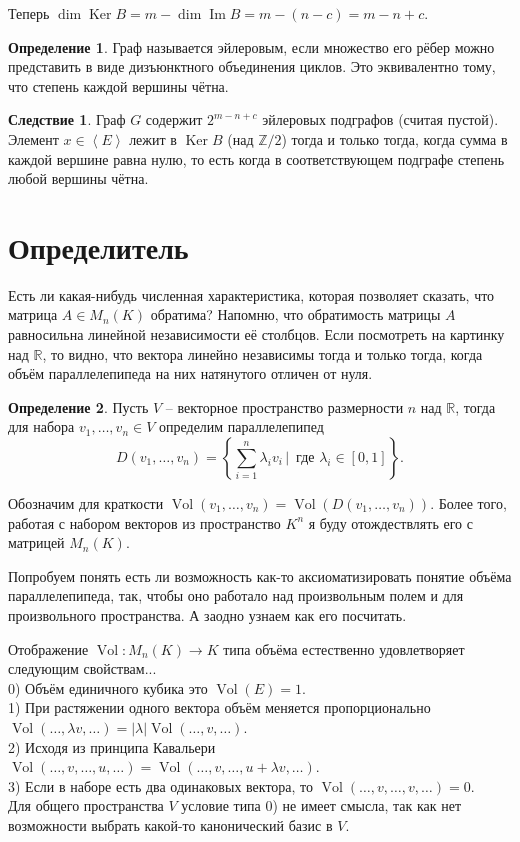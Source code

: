 \documentclass[10pt,a4paper,oneside]{book} %
\theoremstyle{definition}
\newtheorem*{defn}{Определение}
\newtheorem{cor}{Следствие}
\newcommand{\mb}[1]{\mathbb{#1}}
\newcommand{\Vol}{\operatorname{Vol}}
\DeclareMathOperator{\Ker}{Ker}
\renewcommand{\Im}{\operatorname{Im}}
\def\lan{\left\langle }
\def\ran{\right\rangle}
\def\dfn{\begin{defn}}
\def\edfn{\end{defn}}
\def\crl{\begin{cor}}
\def\ecrl{\end{cor}}
\begin{document}
Теперь $\dim \Ker B = m - \dim \Im B= m - (n-c)= m-n +c$.
\endproof

\dfn Граф называется эйлеровым, если множество его рёбер можно представить в виде дизъюнктного объединения циклов. Это эквивалентно тому, что степень каждой вершины чётна.
\edfn

\crl Граф $G$ содержит $2^{m-n+c}$ эйлеровых подграфов (считая пустой).
\proof Элемент $x \in \lan E \ran $ лежит в $\Ker B$ (над $\mb Z/2$) тогда и только тогда, когда сумма в каждой вершине равна нулю, то есть когда в соответствующем подграфе степень любой вершины чётна.
\endproof
\ecrl


\section{Определитель}

Есть ли какая-нибудь численная характеристика, которая позволяет сказать, что матрица $A\in M_n(K)$ обратима? Напомню, что обратимость матрицы $A$ равносильна линейной независимости её столбцов. Если посмотреть на картинку над $\mb R$, то видно, что вектора линейно независимы тогда и только тогда, когда объём параллелепипеда на них натянутого отличен от нуля.

\dfn Пусть $V$ -- векторное пространство размерности $n$ над $\mb R$, тогда для набора  $v_1,\dots,v_n \in V$ определим параллелепипед
$$D(v_1,\dots,v_n)=\left\{\sum_{i=1}^n \lambda_i v_i\,|\, \text{ где } \lambda_i\in [0,1]\right\}.$$
\edfn


Обозначим для краткости $\Vol(v_1,\dots,v_n)= \Vol (D(v_1,\dots,v_n))$. Более того, работая с набором векторов из пространство $K^n$ я буду отождествлять его с матрицей $M_n(K)$. 

Попробуем понять есть ли возможность как-то аксиоматизировать понятие объёма параллелепипеда, так, чтобы оно работало над произвольным полем и для произвольного пространства. А заодно узнаем как его посчитать.

Отображение $\Vol \colon M_n(K) \to K$ типа объёма естественно удовлетворяет следующим свойствам...\\
0) Объём единичного кубика это $\Vol(E)=1$.\\
1) При растяжении одного вектора объём меняется пропорционально $\Vol(\dots,\lambda v,\dots)=|\lambda|\Vol(\dots,v,\dots)$.\\
2) Исходя из принципа Кавальери $\Vol(\dots,v,\dots,u,\dots)=\Vol(\dots,v,\dots,u+\lambda v,\dots)$.\\
3) Если в наборе есть два одинаковых вектора, то $\Vol(\dots,v, \dots, v,\dots)=0$.\\
Для общего пространства $V$ условие типа 0) не имеет смысла, так как нет возможности выбрать какой-то канонический базис в $V$.
\end{document}
